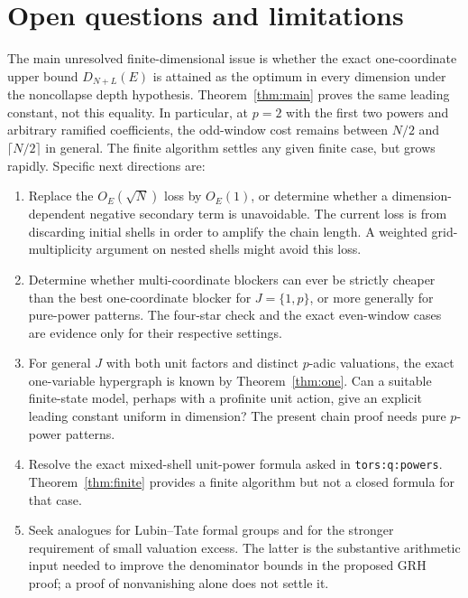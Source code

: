 \documentclass[11pt]{article}
\theoremstyle{definition}
\begin{document}
\section{Open questions and limitations}

The main unresolved finite-dimensional issue is whether the exact one-coordinate upper bound $D_{N+L}(E)$ is attained as the optimum in every dimension under the noncollapse depth hypothesis. Theorem~\ref{thm:main} proves the same leading constant, not this equality. In particular, at $p=2$ with the first two powers and arbitrary ramified coefficients, the odd-window cost remains between $N/2$ and $\lceil N/2\rceil$ in general. The finite algorithm settles any given finite case, but grows rapidly. Specific next directions are:
\begin{enumerate}[leftmargin=*,itemsep=3pt]
\item Replace the $O_E(\sqrt N)$ loss by $O_E(1)$, or determine whether a dimension-dependent negative secondary term is unavoidable. The current loss is from discarding initial shells in order to amplify the chain length. A weighted grid-multiplicity argument on nested shells might avoid this loss.
\item Determine whether multi-coordinate blockers can ever be strictly cheaper than the best one-coordinate blocker for $J=\{1,p\}$, or more generally for pure-power patterns. The four-star check and the exact even-window cases are evidence only for their respective settings.
\item For general $J$ with both unit factors and distinct $p$-adic valuations, the exact one-variable hypergraph is known by Theorem~\ref{thm:one}. Can a suitable finite-state model, perhaps with a profinite unit action, give an explicit leading constant uniform in dimension? The present chain proof needs pure $p$-power patterns.
\item Resolve the exact mixed-shell unit-power formula asked in \texttt{tors:q:powers}. Theorem~\ref{thm:finite} provides a finite algorithm but not a closed formula for that case.
\item Seek analogues for Lubin--Tate formal groups and for the stronger requirement of small valuation excess. The latter is the substantive arithmetic input needed to improve the denominator bounds in the proposed GRH proof; a proof of nonvanishing alone does not settle it.
\end{enumerate}
\end{document}
